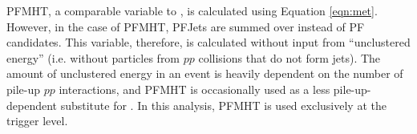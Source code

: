 PFMHT, a comparable variable to \met, is calculated using Equation \ref{eqn:met}.  However, in the case of PFMHT, PFJets
are summed over instead of PF candidates.  This variable, therefore, is calculated without input from 
``unclustered energy'' (i.e. without particles from $pp$ collisions that do not form jets).
The amount of unclustered energy in an event is heavily dependent on the number of pile-up
$pp$ interactions, and PFMHT is occasionally used as a less pile-up-dependent substitute for \met.
In this analysis, PFMHT is used exclusively at the trigger level.
